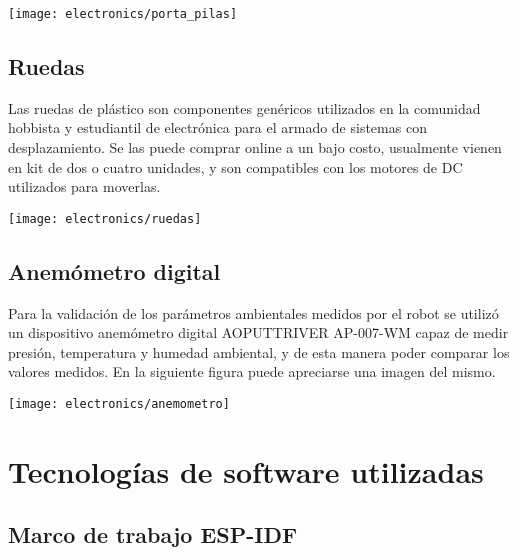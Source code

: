 \begin{center}
  \centering
  \texttt{[image: electronics/porta\_pilas]}
  \label{fig:porta_pilas}
\end{center}

\subsection{Ruedas}

Las ruedas de plástico son componentes genéricos utilizados en la comunidad hobbista y estudiantil de electrónica para el armado de sistemas con desplazamiento. Se las puede comprar online a un bajo costo, usualmente vienen en kit de dos o cuatro unidades, y son compatibles con los motores de DC utilizados para moverlas.

\begin{center}
  \centering
  \texttt{[image: electronics/ruedas]}
  \label{fig:ruedas}
\end{center}

\subsection{Anemómetro digital}

Para la validación de los parámetros ambientales medidos por el robot se utilizó un dispositivo anemómetro digital AOPUTTRIVER AP-007-WM capaz de medir presión, temperatura y humedad ambiental, y de esta manera poder comparar los valores medidos. En la siguiente figura puede apreciarse una imagen del mismo.

\begin{center}
\texttt{[image: electronics/anemometro]}
  \label{fig:anemometro}
\end{center}


\section{Tecnologías de software utilizadas}

\subsection{Marco de trabajo ESP-IDF}

